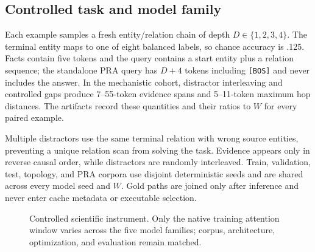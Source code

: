 \subsection{Controlled task and model family}

Each example samples a fresh entity/relation chain of depth $D\in\{1,2,3,4\}$.  The terminal entity
maps to one of eight balanced labels, so chance accuracy is .125.  Facts contain five tokens and the
query contains a start entity plus a relation sequence; the standalone PRA query has $D+4$ tokens
including \texttt{[BOS]} and never includes the answer.  In the mechanistic cohort, distractor
interleaving and controlled gaps produce 7--55-token evidence spans and 5--11-token maximum hop
distances.  The artifacts record these quantities and their ratios to $W$ for every paired example.

Multiple distractors use the same terminal relation with wrong source entities, preventing a unique
relation scan from solving the task.  Evidence appears only in reverse causal order, while distractors
are randomly interleaved.  Train, validation, test, topology, and PRA corpora use disjoint deterministic
seeds and are shared across every model seed and $W$.  Gold paths are joined only after inference and
never enter cache metadata or executable selection.

\begin{figure}[H]
\centering
{}
\caption{Controlled scientific instrument.  Only the native training attention window varies across
the five model families; corpus, architecture, optimization, and evaluation remain matched.}
\label{fig:controlled-task}
\end{figure}

